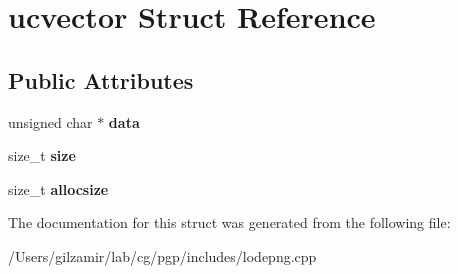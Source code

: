 \hypertarget{structucvector}{}\section{ucvector Struct Reference}
\label{structucvector}
\subsection*{Public Attributes}
\begin{DoxyCompactItemize}
\item 
\mbox{\label{structucvector_ace794c5713208c5a20f21762cd87c919}} 
unsigned char $\ast$ {\bfseries data}
\item 
\mbox{\label{structucvector_a27c99c34de0c5b3ca0c242d402c69499}} 
size\+\_\+t {\bfseries size}
\item 
\mbox{\label{structucvector_a235168baac13f0c78bd3e309dc170f90}} 
size\+\_\+t {\bfseries allocsize}
\end{DoxyCompactItemize}


The documentation for this struct was generated from the following file\+:\begin{DoxyCompactItemize}
\item 
/\+Users/gilzamir/lab/cg/pgp/includes/lodepng.\+cpp\end{DoxyCompactItemize}
